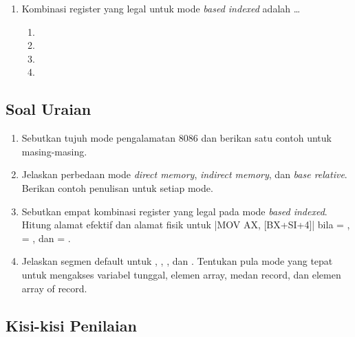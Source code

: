 \begin{enumerate}
    \item Kombinasi register yang legal untuk mode \textit{based
          indexed} adalah \dots
          \begin{enumerate}
              \item \code{[BX+BP]}
              \item \code{[SI+DI]}
              \item \code{[BX+DI]}
              \item \code{[AX+SI]}
          \end{enumerate}
\end{enumerate}

\subsection{Soal Uraian}

\begin{enumerate}
    \item Sebutkan tujuh mode pengalamatan 8086 dan berikan satu
          contoh untuk masing-masing.

    \item Jelaskan perbedaan mode \textit{direct memory},
          \textit{indirect memory}, dan \textit{base relative}.
          Berikan contoh penulisan untuk setiap mode.

    \item Sebutkan empat kombinasi register yang legal pada mode
          \textit{based indexed}. Hitung alamat efektif dan alamat
          fisik untuk \lstasm|MOV AX, [BX+SI+4]| bila
           = ,  = , dan
           = .

    \item Jelaskan segmen default untuk , ,
          , dan . Tentukan pula mode yang tepat untuk
          mengakses variabel tunggal, elemen array, medan record, dan
          elemen array of record.
\end{enumerate}

\subsection{Kisi-kisi Penilaian}

